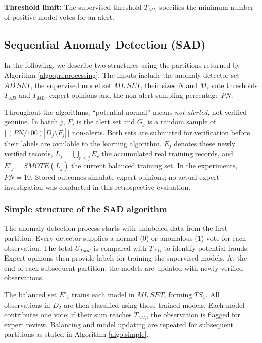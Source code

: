 \textbf{Threshold limit:} The supervised threshold $T_{ML}$ specifies the
minimum number of positive model votes for an alert.

\subsection{Sequential Anomaly Detection (SAD)}\label{SSC:SAD}
In the following, we describe two structures using the partitions returned
by Algorithm \ref{algo:preprocessing}. The inputs include the anomaly
detector set $AD\ SET$, the supervised model set $ML\ SET$, their sizes
$N$ and $M$, vote thresholds $T_{AD}$ and $T_{ML}$, expert opinions and the
non-alert sampling percentage $PN$.

\begin{revised}
Throughout the algorithms, ``potential normal'' means \emph{not alerted},
not verified genuine. In batch $j$, $F_j$ is the alert set and $G_j$ is a
random sample of $\lceil(PN/100)|D_j\setminus F_j|\rceil$ non-alerts.
Both sets are submitted for verification before their labels are available
to the learning algorithm. $E_j$ denotes these newly verified records,
$L_j=\bigcup_{r\leq j}E_r$ the accumulated real training records, and
$E'_j=SMOTE(L_j)$ the current balanced training set. In the experiments,
$PN=10$. Stored outcomes simulate expert opinions; no actual expert
investigation was conducted in this retrospective evaluation.
\end{revised}

\subsubsection*{Simple structure of the SAD algorithm}\label{sec4_2}
The anomaly detection process starts with unlabeled data from the first
partition. Every detector supplies a normal (0) or anomalous (1) vote for
each observation. The total $U_{Total}$ is compared with $T_{AD}$ to identify
potential frauds. Expert opinions then provide labels for training the
supervised models. At the end of each subsequent partition, the models are
updated with newly verified observations.

The balanced set $E'_1$ trains each model in $ML\ SET$, forming $TS_1$.
All observations in $D_2$ are then classified using those trained models.
Each model contributes one vote; if their sum reaches $T_{ML}$, the
observation is flagged for expert review. Balancing and model updating are
repeated for subsequent partitions as stated in Algorithm \ref{algo:simple}.


